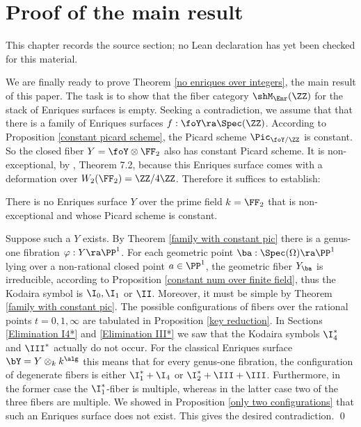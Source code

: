 \chapter{Proof of the main result}
\label{no-enriques-surface-over-the-integers-chapter-16}

\begin{remark}
\label{no-enriques-surface-over-the-integers-chapter-16-source}
This chapter records the source section; no Lean declaration has yet been checked for this material.
\notready
\end{remark}

\label{Proof}

We are finally ready to prove Theorem \ref{no enriques over integers},  the main result of this paper.
The task is to show that the fiber category $\shM_\Enr(\ZZ)$ for the stack of Enriques surfaces is empty.
Seeking a contradiction, we assume that that there is a family of Enriques surfaces
$f:\foY\ra \Spec(\ZZ)$. According to Proposition \ref{constant picard scheme}, the Picard scheme $\Pic_{\foY/\ZZ}$ is constant.
So the closed fiber $Y=\foY\otimes\FF_2$ also has constant Picard scheme.
It is  non-exceptional, by  \cite{Schroeer-2021b}, Theorem 7.2, because this Enriques surface
 comes with a deformation over $W_2(\FF_2)=\ZZ/4\ZZ$.
Therefore it suffices to establish:

\begin{theorem}
\notready
\label{no non-exceptional}
There is no  Enriques surface $Y$ over the prime field $k=\FF_2$  that is  non-exceptional and  whose   Picard scheme
is constant.
\end{theorem}

\proof
Suppose such a $Y$ exists.
By Theorem \ref{family with constant pic} there is a genus-one fibration $\varphi:Y\ra\PP^1$.
For each geometric point $\ba:\Spec(\Omega)\ra \PP^1$ lying over a non-rational closed point  $a\in\PP^1$, the geometric fiber $Y_\ba$
is  irreducible, according to Proposition \ref{constant num over finite field},  thus the  Kodaira symbol is $\I_0, \I_1$ or $\II$.
Moreover, it must be simple by Theorem \ref{family with constant pic}.
The possible configurations of fibers over the rational points $t=0,1,\infty$ are tabulated
in Proposition \ref{key reduction}.
 In Sections \ref{Elimination I4*} and \ref{Elimination III*} we saw that the Kodaira symbols
$\I_4^*$ and $\III^*$ actually do not occur.
For the classical Enriques surface $\bY=Y\otimes_kk^\alg$   this means that for every genus-one fibration, the configuration
of degenerate fibers is either $\I_1^*+\I_4$ or $\I_2^*+\III+\III$. Furthermore, in the former case the $\I_1^*$-fiber is multiple,
whereas in the latter case two of the three fibers are multiple.
 We showed in Proposition \ref{only two configurations} that
such an  Enriques surface does not exist. This gives the desired contradiction.
\qed


